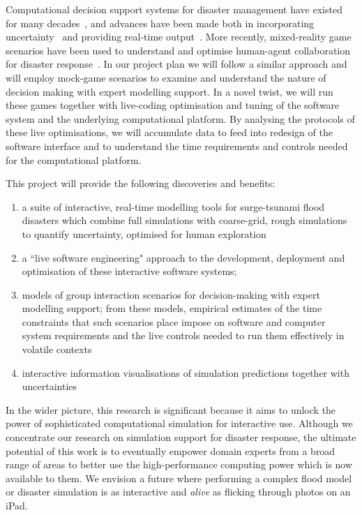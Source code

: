 \documentclass[a4paper,fontsize=12pt]{scrartcl}
\begin{document}
Computational decision support systems for disaster management
have existed for many decades~\parencite{wallace_decision_1985}, and
advances have been made both in incorporating
uncertainty~\parencite{thompson_social_2014-1,neale_navigating_2015}
and providing real-time output~\parencite{yu_support_2006}. More recently, 
mixed-reality game scenarios have been used to understand and optimise human-agent 
collaboration for disaster response~\parencite{ramchurn2016human}.
In our project plan we will follow a similar approach and will employ mock-game scenarios to examine and understand the nature of decision making with expert modelling support. In a novel twist, we will run these games together with live-coding optimisation and tuning of the software system and the underlying computational platform. By analysing the protocols of these live optimisations, we will accumulate data to feed into redesign of the software interface and to understand the time requirements and controls needed for the computational platform.


This project will provide the following discoveries and benefits:
\begin{enumerate}

\item a suite of interactive, real-time modelling tools for surge-tsunami flood disasters which combine
full simulations with coarse-grid, rough simulations to quantify
uncertainty, optimised for human exploration


\item a ``live software engineering" approach to the development, deployment 
and optimisation of these interactive software systems; 

\item models of group interaction scenarios for decision-making 
 with expert modelling support; from these models, empirical estimates of  the 
time constraints that such scenarios place impose on software and computer system requirements and the live controls needed to run them effectively in volatile contexts

\item interactive information visualisations of simulation predictions
together with uncertainties
 

\end{enumerate}

In the wider picture, this research is significant because it aims to unlock the power of
sophisticated
computational simulation for interactive use. Although we concentrate
our research on simulation support for disaster response, the
ultimate potential of this work is to eventually empower domain
experts from a broad range of areas to better use the high-performance
computing power which is now available to them. We envision a future
where performing a complex flood model or disaster simulation is as
interactive and \emph{alive} as flicking through photos on an iPad.
\end{document}
